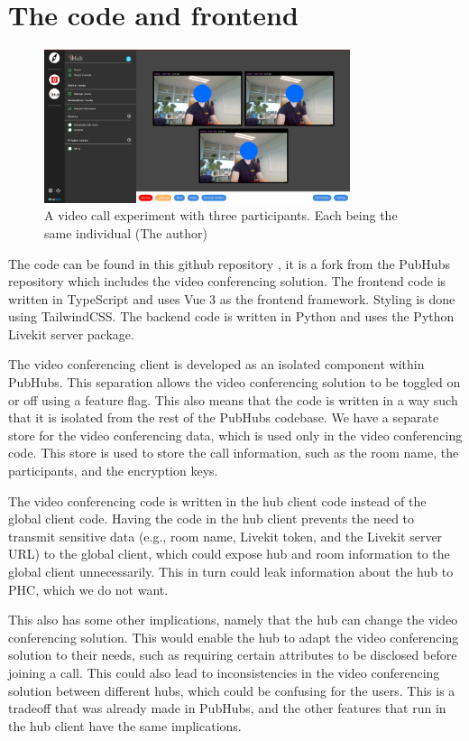 \documentclass{report}
\begin{document}
\section{The code and frontend}
\begin{figure}[!hbt]
\centering
\includegraphics[width=0.8\textwidth]{img/frontend.png}
\caption{A video call experiment with three participants. Each being the same individual (The author)}
\label{fig:front-end-setup}
\end{figure}
The code can be found in this github repository \cite{horst_gulianrdgdmaster-scriptie-pubhubs_2024}, it is a fork from the PubHubs
repository which includes the video conferencing solution. The frontend code is written in TypeScript and uses Vue 3
as the frontend framework. Styling is done using TailwindCSS. The backend code is written in Python and uses the
Python Livekit server package.

The video conferencing client is developed as an isolated component within PubHubs. This separation allows the
video conferencing solution to be toggled on or off using a feature flag.
This also means that the code is written in a way such that it is isolated from the rest of the PubHubs codebase.
We have a separate store for the video conferencing data, which is used only in the video conferencing code.
This store is used to store the call information, such as the room name, the participants, and the encryption keys.

The video conferencing code is written in the hub client code instead of the global client code. Having the code in
the hub client prevents the need to transmit sensitive data (e.g., room name, Livekit token, and the Livekit
server URL) to the global client, which could expose hub and room information to the global client unnecessarily.
This in turn could leak information about the hub to PHC, which we do not want.

This also has some other implications, namely that the hub can change the video conferencing solution.
This would enable the hub to adapt the video conferencing solution to their needs, such as requiring certain
attributes to be disclosed before joining a call. This could also lead to inconsistencies in the video conferencing
solution between different hubs, which could be confusing for the users. This is a tradeoff that was already made in
PubHubs, and the other features that run in the hub client have the same implications.
\end{document}
